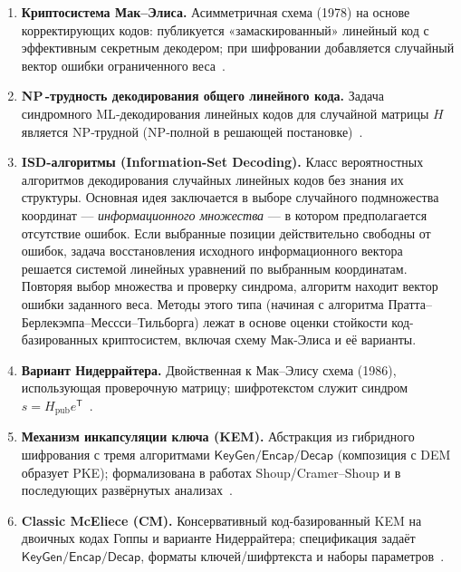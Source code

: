 \begin{enumerate}
\item \label{def:mceliece}
\textbf{Криптосистема Мак–Элиса.}
Асимметричная схема (1978) на основе корректирующих кодов: публикуется «замаскированный» линейный код с эффективным секретным декодером; при шифровании добавляется случайный вектор ошибки ограниченного веса~\cite{McEliece1978}.

\item \label{def:np}
\textbf{NP\,-трудность декодирования общего линейного кода.}
Задача синдромного ML‑декодирования линейных кодов для случайной матрицы \(H\) является NP‑трудной (NP‑полной в решающей постановке)~\cite{BMvT1978}.

\item \label{def:isd}
\textbf{ISD-алгоритмы (Information-Set Decoding).}
Класс вероятностных алгоритмов декодирования случайных линейных кодов без знания их структуры.
Основная идея заключается в выборе случайного подмножества координат — \emph{информационного множества} —
в котором предполагается отсутствие ошибок.
Если выбранные позиции действительно свободны от ошибок, задача восстановления исходного информационного вектора
решается системой линейных уравнений по выбранным координатам.
Повторяя выбор множества и проверку синдрома, алгоритм находит вектор ошибки заданного веса.
Методы этого типа (начиная с алгоритма Пратта–Берлекэмпа–Мессси–Тильборга) 
лежат в основе оценки стойкости код-базированных криптосистем,
включая схему Мак-Элиса и её варианты.
~\cite{Prange1962,Dumer1991,MayMeurerThomae2011,BernsteinLangePeters2011}


\item \label{def:niederreiter}
\textbf{Вариант Нидеррайтера.}
Двойственная к Мак–Элису схема (1986), использующая проверочную матрицу; шифротекстом служит синдром \(s=H_{\text{pub}}e^{\mathsf T}\)~\cite{Niederreiter1986}.

\item \label{def:kem}
\textbf{Механизм инкапсуляции ключа (KEM).}
Абстракция из гибридного шифрования с тремя алгоритмами \(\textsf{KeyGen/Encap/Decap}\) (композиция с DEM образует PKE); формализована в работах Shoup/Cramer–Shoup и в последующих развёрнутых анализах~\cite{ShoupISO2001,CramerShoup2003,AbeTagKEM2005}.

\item \label{def:cm}
\textbf{Classic McEliece (CM).}
Консервативный код‑базированный KEM на двоичных кодах Гоппы и варианте Нидеррайтера; спецификация задаёт \(\textsf{KeyGen/Encap/Decap}\), форматы ключей/шифртекста и наборы параметров~\cite{CMspec2022,NISTIR8413}.


\end{enumerate}
